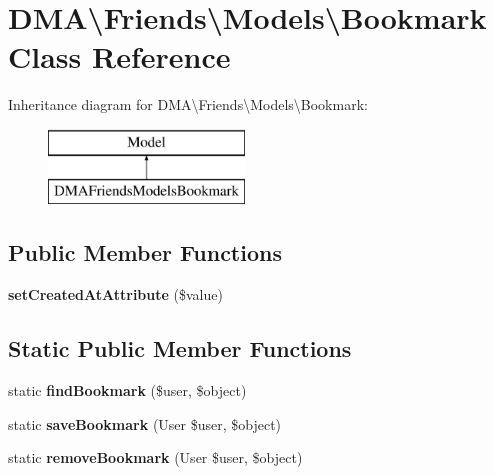 \hypertarget{classDMA_1_1Friends_1_1Models_1_1Bookmark}{\section{D\+M\+A\textbackslash{}Friends\textbackslash{}Models\textbackslash{}Bookmark Class Reference}
\label{classDMA_1_1Friends_1_1Models_1_1Bookmark}
}
Inheritance diagram for D\+M\+A\textbackslash{}Friends\textbackslash{}Models\textbackslash{}Bookmark\+:\begin{figure}[H]
\begin{center}
\leavevmode
\includegraphics[height=2.000000cm]{d9/de4/classDMA_1_1Friends_1_1Models_1_1Bookmark}
\end{center}
\end{figure}
\subsection*{Public Member Functions}
\begin{DoxyCompactItemize}
\item 
\hypertarget{classDMA_1_1Friends_1_1Models_1_1Bookmark_a5afcf6b2bb5788914bec586b3001485d}{{\bfseries set\+Created\+At\+Attribute} (\$value)}\label{classDMA_1_1Friends_1_1Models_1_1Bookmark_a5afcf6b2bb5788914bec586b3001485d}

\end{DoxyCompactItemize}
\subsection*{Static Public Member Functions}
\begin{DoxyCompactItemize}
\item 
\hypertarget{classDMA_1_1Friends_1_1Models_1_1Bookmark_abee78f0ddbe31aec5799062b7e3a8910}{static {\bfseries find\+Bookmark} (\$user, \$object)}\label{classDMA_1_1Friends_1_1Models_1_1Bookmark_abee78f0ddbe31aec5799062b7e3a8910}

\item 
\hypertarget{classDMA_1_1Friends_1_1Models_1_1Bookmark_ab25742747cc7f04c2b068329b0f4b955}{static {\bfseries save\+Bookmark} (User \$user, \$object)}\label{classDMA_1_1Friends_1_1Models_1_1Bookmark_ab25742747cc7f04c2b068329b0f4b955}

\item 
\hypertarget{classDMA_1_1Friends_1_1Models_1_1Bookmark_a13fba3086bee7776d59f6d23a6e68728}{static {\bfseries remove\+Bookmark} (User \$user, \$object)}\label{classDMA_1_1Friends_1_1Models_1_1Bookmark_a13fba3086bee7776d59f6d23a6e68728}

\end{DoxyCompactItemize}
